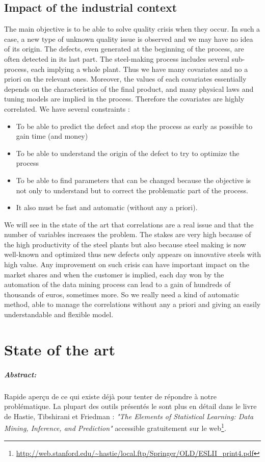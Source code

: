 \documentclass[12pt,a4paper]{report}
\begin{document}
	\section{Impact of the industrial context}
	 The main objective is to be able to solve quality crisis when they occur. In such a case, a new type of unknown quality issue is observed and we may have no idea of its origin. The defects, even generated at the beginning of the process, are often detected in its last part. The steel-making process includes several sub-process, each implying a whole plant. Thus we have many covariates and no a priori on the relevant ones. Moreover, the values of each covariates essentially depends on the characteristics of the final product, and many physical laws and tuning models are implied in the process. Therefore the covariates are highly correlated.
	We have several constraints :
	\begin{itemize}
		\item To be able to predict the defect and stop the process as early as possible to gain time (and money)
		\item To be able to understand the origin of the defect to try to optimize the process
		\item To be able to find parameters that can be changed because the objective is not only to understand but to correct the problematic part of the process.
		\item It also must be fast and automatic (without any a priori).
	\end{itemize}
	We will see in the state of the art that correlations are a real issue and that the number of variables increases the problem.	
	The stakes are very high because of the high productivity of the steel plants but also because steel making is now well-known and optimized thus new defects only appears on innovative steels with high value. Any improvement on such crisis can have important impact on the market shares and when the customer is implied, each day won by the automation of the data mining process can lead to a gain of hundreds of thousands of euros, sometimes more. So we really need a kind of automatic method, able to manage the correlations without any a priori and giving an easily understandable and flexible model.
	
\chapter{State of the art}
\paragraph{Abstract:} Rapide aperçu de ce qui existe déjà pour tenter de répondre à notre problématique. La plupart des outils présentés le sont plus en détail dans le livre de Hastie, Tibshirani et Friedman : {\it "The Elements of Statistical Learning: Data Mining, Inference, and Prediction" } accessible gratuitement sur le web\footnote{ \url{http://web.stanford.edu/~hastie/local.ftp/Springer/OLD/ESLII_print4.pdf}}.
\end{document}
